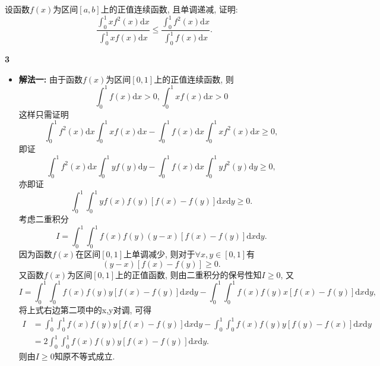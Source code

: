 \documentclass[12pt]{article}
\newenvironment{solution}[2][Solution]{\begin{trivlist}
\item[\hskip \labelsep {\bfseries #1}]}{\end{trivlist}}
\newenvironment{problem}[2][Problem]{\begin{trivlist}
\item[\hskip \labelsep {\bfseries #1}\hskip \labelsep {\bfseries #2.}]}{\end{trivlist}}
\begin{document}
\vspace{3cm}


\begin{problem}{3}
    设函数$f(x)$为区间$\left[a, b\right]$上的正值连续函数, 且单调递减, 证明:
    \[
        \frac{\int_0^1 xf^2(x)\mathrm{d}x}{\int_0^1 xf(x)\mathrm{d}x} \leq \frac{\int_0^1 f^2(x)\mathrm{d}x}{\int_0^1 f(x)\mathrm{d}x}.
    \]
\end{problem}


\begin{solution}{3} \textbf{3}

    \begin{itemize}
        \item \textbf{解法一:} 由于函数$f(x)$为区间$\left[0, 1\right]$上的正值连续函数, 则
            \[
                \int_0^1 f(x)\mathrm{d}x > 0, \int_0^1 xf(x)\mathrm{d}x > 0    
            \]
            这样只需证明
            \[
                \int_0^1 f^2(x)\mathrm{d}x \int_0^1 xf(x)\mathrm{d}x - \int_0^1 f(x)\mathrm{d}x \int_0^1 xf^2(x)\mathrm{d}x \geq 0,    
            \]
            即证
            \[
                \int_0^1 f^2(x)\mathrm{d}x \int_0^1 yf(y)\mathrm{d}y - \int_0^1 f(x)\mathrm{d}x \int_0^1 yf^2(y)\mathrm{d}y \geq 0,    
            \]
            亦即证
            \[
                \int_0^1 \int_0^1 yf(x)f(y)[f(x) - f(y)]\mathrm{d}x\mathrm{d}y \geq 0.    
            \]
            考虑二重积分
            \[
                I = \int_0^1 \int_0^1 f(x)f(y)(y-x)[f(x) - f(y)]\mathrm{d}x\mathrm{d}y.    
            \]
            因为函数$f(x)$在区间$\left[0, 1\right]$上单调减少, 则对于$\forall x, y\in \left[0, 1\right]$有
            \[
                (y-x)[f(x) - f(y)] \geq 0.    
            \]
            又函数$f(x)$为区间$\left[0, 1\right]$上的正值函数, 则由二重积分的保号性知$I\geq 0$, 又
            \[
                I=\int_0^1 \int_0^1 f(x)f(y)y[f(x)-f(y)]\mathrm{d}x\mathrm{d}y - \int_0^1 \int_0^1 f(x)f(y)x[f(x)-f(y)]\mathrm{d}x\mathrm{d}y,    
            \]
            将上式右边第二项中的x,y对调, 可得
            \[
                \begin{aligned}
                    I&=\int_0^1 \int_0^1 f(x)f(y)y[f(x)-f(y)]\mathrm{d}x\mathrm{d}y - \int_0^1 \int_0^1 f(x)f(y)y[f(y)-f(x)]\mathrm{d}x\mathrm{d}y \\
                    &= 2\int_0^1 \int_0^1 f(x)f(y)y[f(x) - f(y)]\mathrm{d}x\mathrm{d}y.
                \end{aligned}
            \]
            则由$I\geq 0$知原不等式成立.


\end{itemize}
\end{solution}
\end{document}
